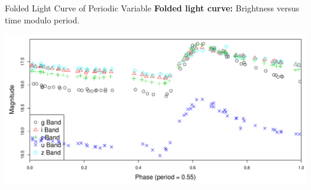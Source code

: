 \documentclass[12pt]{beamer}
\begin{document}
\begin{frame}{Folded Light Curve of Periodic Variable}
\textbf{Folded light curve:} Brightness versus time modulo period.
\begin{center}
\includegraphics[scale=.3]{figs/folded_13350.pdf}
\end{center}
\end{frame}
\end{document}
